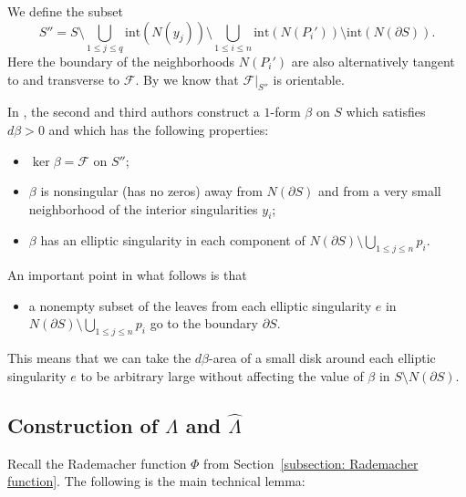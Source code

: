 \documentclass[10pt]{amsart}
\let\mathcal\mathscr
\newcommand{\inte}{\mathrm{int}}
\theoremstyle{plain}
\theoremstyle{definition}
\numberwithin{equation}{subsection}
\newcommand{\cF}{\mathcal{F}}
\newcommand{\bdry}{\partial}
\begin{document}
We define the subset
\begin{equation}
S'' =S \setminus\bigcup_{1\leq j\leq q} \inte(N(y_j))\setminus\bigcup_{1\leq i\leq n} \inte(N(P_i')) \setminus\inte(N(\bdry S)).
\end{equation}
Here the boundary of the neighborhoods $N(P_i')$ are also alternatively tangent to and transverse to $\cF$. By \cite[Claim 6.4]{CH2} we know that $\cF \vert_{S''}$ is orientable.

In \cite[Prop.\,6.3]{CH2}, the second and third authors construct a $1$-form $\beta$ on $S$ which satisfies $d\beta>0$ and which has the following properties:
\begin{itemize}
\item[(P1)] $\ker \beta=\cF$ on $S''$;
\item[(P2)] $\beta$ is nonsingular (\ie has no zeros) away from $N(\bdry S)$ and from a very small neighborhood of the interior singularities $y_i$;
\item[(P3)] $\beta$ has an elliptic singularity in each component of $N(\bdry S)\setminus\bigcup_{1\leq j\leq n} p_i$.
\end{itemize}
An important point in what follows is that
\begin{itemize}
\item[(P4)] a nonempty subset of the leaves from each elliptic singularity $e$ in $N(\bdry S)\setminus\bigcup_{1\leq j\leq n} p_i$ go to the boundary $\partial S$.
\end{itemize}
This means that we can take the $d\beta$-area of a small disk around each elliptic singularity $e$ to be arbitrary large without affecting the value of $\beta$ in $S\setminus N(\bdry S)$.

\subsection{Construction of $\Lambda$ and $\widehat\Lambda$} \label{subsection: construction of Lambda}

Recall the Rademacher function $\Phi$ from Section~\ref{subsection: Rademacher function}. The following is the main technical lemma:
\end{document}
